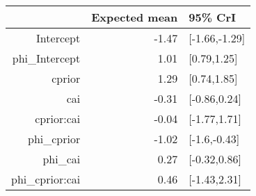 \begin{tabular}{rrl}
  \hline
 & Expected mean & 95\% CrI \\ 
  \hline
Intercept & -1.47 & [-1.66,-1.29] \\ 
  phi\_Intercept & 1.01 & [0.79,1.25] \\ 
  cprior & 1.29 & [0.74,1.85] \\ 
  cai & -0.31 & [-0.86,0.24] \\ 
  cprior:cai & -0.04 & [-1.77,1.71] \\ 
  phi\_cprior & -1.02 & [-1.6,-0.43] \\ 
  phi\_cai & 0.27 & [-0.32,0.86] \\ 
  phi\_cprior:cai & 0.46 & [-1.43,2.31] \\ 
   \hline
\end{tabular}

